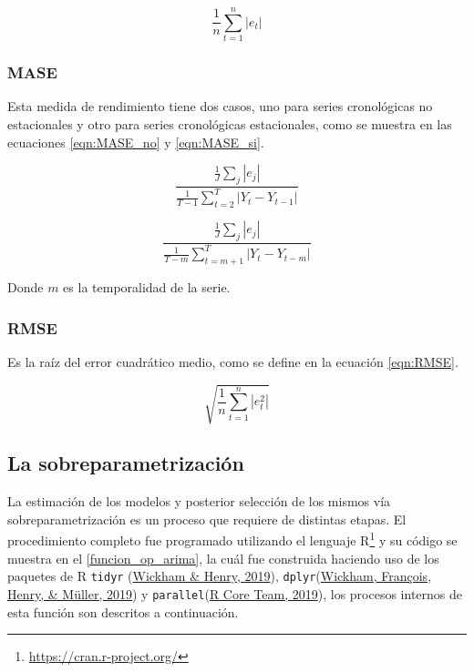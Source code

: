 \documentclass[
]{article}
\begin{document}
\begin{equation}
\label{eqn:MAE}
\frac{1}{n}\sum_{t=1}^n |e_t|
\end{equation}

\subsubsection{MASE}

Esta medida de rendimiento tiene dos casos, uno para series cronológicas
no estacionales y otro para series cronológicas estacionales, como se
muestra en las ecuaciones \ref{eqn:MASE_no} y \ref{eqn:MASE_si}.

\begin{equation}
\label{eqn:MASE_no}
\frac{\frac{1}{J}\sum_j|e_j|}{\frac{1}{T-1}\sum_{t=2}^T|Y_t-Y_{t-1}|}
\end{equation}

\begin{equation}
\label{eqn:MASE_si}
\frac{\frac{1}{J}\sum_j|e_j|}{\frac{1}{T-m}\sum_{t=m+1}^T|Y_t-Y_{t-m}|}
\end{equation}

Donde \(m\) es la temporalidad de la serie.

\subsubsection{RMSE}

Es la raíz del error cuadrático medio, como se define en la ecuación
\ref{eqn:RMSE}.

\begin{equation}
\label{eqn:RMSE}
\sqrt{\frac{1}{n}\sum_{t=1}^n |e_t^2|}
\end{equation}

\subsection{La sobreparametrización}

La estimación de los modelos y posterior selección de los mismos vía
sobreparametrización es un proceso que requiere de distintas etapas. El
procedimiento completo fue programado utilizando el lenguaje
R\footnote{\url{https://cran.r-project.org/}} y su código se muestra en
el \ref{funcion_op_arima}, la cuál fue construida haciendo uso de los
paquetes de R \texttt{tidyr} (\protect\hyperlink{ref-tidyr}{Wickham \&
Henry, 2019}), \texttt{dplyr}(\protect\hyperlink{ref-dplyr}{Wickham,
François, Henry, \& Müller, 2019}) y
\texttt{parallel}(\protect\hyperlink{ref-parallel}{R Core Team, 2019}),
los procesos internos de esta función son descritos a continuación.
\end{document}
